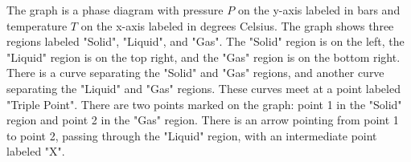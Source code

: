 The graph is a phase diagram with pressure \( P \) on the y-axis labeled in bars and temperature \( T \) on the x-axis labeled in degrees Celsius. The graph shows three regions labeled "Solid", "Liquid", and "Gas". The "Solid" region is on the left, the "Liquid" region is on the top right, and the "Gas" region is on the bottom right. There is a curve separating the "Solid" and "Gas" regions, and another curve separating the "Liquid" and "Gas" regions. These curves meet at a point labeled "Triple Point". There are two points marked on the graph: point 1 in the "Solid" region and point 2 in the "Gas" region. There is an arrow pointing from point 1 to point 2, passing through the "Liquid" region, with an intermediate point labeled "X".
